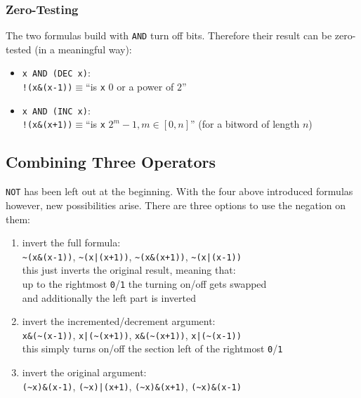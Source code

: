 \subsubsection*{Zero-Testing}
The two formulas build with \lstinline$AND$ turn off bits.
Therefore their result can be zero-tested (in a meaningful way):
\begin{itemize}
\item \lstinline$x AND (DEC x)$:\\
    \lstinline$!(x&(x-1))$$\equiv$``is \lstinline$x$ $0$ or a power of $2$''
\item \lstinline$x AND (INC x)$:\\
    \lstinline$!(x&(x+1))$$\equiv$``is \lstinline$x$ $2^m - 1, m \in [0,n]$''
    (for a bitword of length $n$)
\end{itemize}


\subsection*{Combining Three Operators}

\lstinline$NOT$ has been left out at the beginning.
With the four above introduced formulas however, new possibilities arise.
There are three options to use the negation on them:
\begin{enumerate}
\item invert the full formula:\\
    \lstinline$~(x&(x-1))$, \lstinline$~(x|(x+1))$,
    \lstinline$~(x&(x+1))$, \lstinline$~(x|(x-1))$\\
    this just inverts the original result,
    meaning that:\\
    up to the rightmost \lstinline$0$/\lstinline$1$
    the turning on/off gets swapped\\
    and additionally the left part is inverted
\item invert the incremented/decrement argument:\\
    \lstinline$x&(~(x-1))$, \lstinline$x|(~(x+1))$,
    \lstinline$x&(~(x+1))$, \lstinline$x|(~(x-1))$\\
    this simply turns on/off the section
    left of the rightmost \lstinline$0$/\lstinline$1$
\item invert the original argument:\\
    \lstinline$(~x)&(x-1)$, \lstinline$(~x)|(x+1)$,
    \lstinline$(~x)&(x+1)$, \lstinline$(~x)&(x-1)$\\
\end{enumerate}

